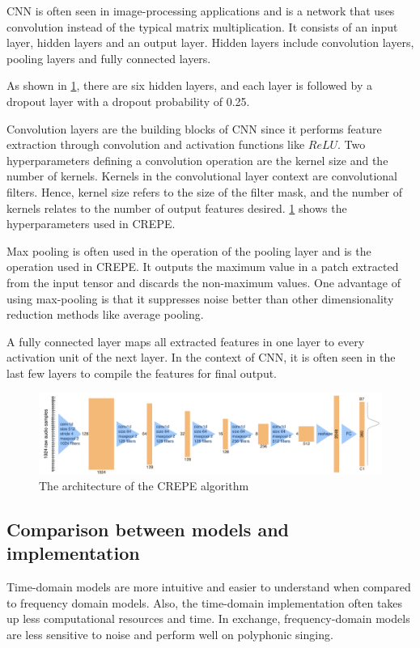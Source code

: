 \begin{enumerate}
    CNN is often seen in image-processing applications and is a network that uses convolution instead of the typical matrix multiplication.
    It consists of an input layer, hidden layers and an output layer. Hidden layers include convolution layers, pooling layers and fully connected layers.
    
    As shown in \cref{CREPE}, there are six hidden layers, and each layer is followed by a dropout layer with a dropout probability of 0.25. 

    Convolution layers are the building blocks of CNN since it performs feature extraction through convolution and activation functions like $ReLU$.
    Two hyperparameters defining a convolution operation are the kernel size and the number of kernels. Kernels in the convolutional layer context are convolutional
    filters. Hence, kernel size refers to the size of the filter mask, and the number of kernels relates to the number of output features desired. \cref{CREPE} shows the hyperparameters
    used in CREPE.

    Max pooling is often used in the operation of the pooling layer and is the operation used in CREPE. It outputs the maximum value in a patch extracted from the
    input tensor and discards the non-maximum values. 
    One advantage of using max-pooling is that it suppresses noise better than other dimensionality reduction methods like average pooling.

    A fully connected layer maps all extracted features in one layer to every activation unit of the next layer. In the context of CNN, it is often seen in the
    last few layers to compile the features for final output.

    \begin{figure}
        \centering
        \includegraphics[width=0.85\columnwidth]{Figures/CREPE.png}
        \caption{The architecture of the CREPE algorithm}
        \label{CREPE}
    \end{figure}
\end{enumerate}

\subsection{Comparison between models and implementation}
Time-domain models are more intuitive and easier to understand when compared to frequency domain models.
Also, the time-domain implementation often takes up less computational resources and time.
In exchange, frequency-domain models are less sensitive to noise and perform well on polyphonic singing.

